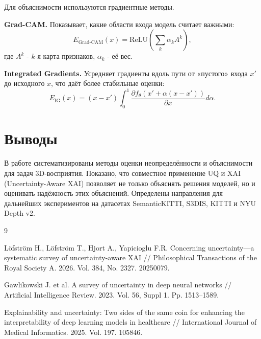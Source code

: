 \documentclass{misisarticle}
\begin{document}
Для объяснимости используются градиентные методы.

\textbf{Grad-CAM.} Показывает, какие области входа модель считает важными:
$$E_{\text{Grad-CAM}}(x) = \text{ReLU}\left( \sum_k \alpha_k A^k \right),$$
где $A^k$ - $k$-я карта признаков, $\alpha_k$ - её вес.

\textbf{Integrated Gradients.} Усредняет градиенты вдоль пути от «пустого» входа $x'$ до исходного $x$, что даёт более стабильные оценки:
$$E_{\text{IG}}(x) = (x - x') \int_0^1 \frac{\partial f_\theta(x' + \alpha(x - x'))}{\partial x} d\alpha.$$

\section*{Выводы}
В работе систематизированы методы оценки неопределённости и объяснимости для задач 3D-восприятия. Показано, что совместное применение UQ и XAI (Uncertainty-Aware XAI) позволяет не только объяснять решения моделей, но и оценивать надёжность этих объяснений. Определены направления для дальнейших экспериментов на датасетах SemanticKITTI, S3DIS, KITTI и NYU Depth v2.

\begin{thebibliography}{9}

Löfström H., Löfström T., Hjort A., Yapicioglu F.R. Concerning uncertainty—a systematic survey of uncertainty-aware XAI // Philosophical Transactions of the Royal Society A. 2026. Vol. 384, No. 2327. 20250079.

Gawlikowski J. et al. A survey of uncertainty in deep neural networks // Artificial Intelligence Review. 2023. Vol. 56, Suppl 1. Pp. 1513–1589.

Explainability and uncertainty: Two sides of the same coin for enhancing the interpretability of deep learning models in healthcare // International Journal of Medical Informatics. 2025. Vol. 197. 105846.

\end{thebibliography}
\end{document}
